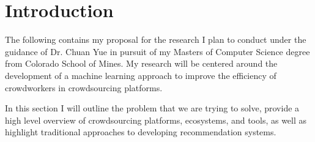 \documentclass[letterpaper,12pt]{article}
\begin{document}





\bodymatter



\chapter{Introduction}

The following contains my proposal for the research I plan to conduct under the guidance of Dr. Chuan Yue in pursuit of my Masters of Computer Science degree from Colorado School of Mines. My research will be centered around the development of a machine learning approach to improve the efficiency of crowdworkers in crowdsourcing platforms.

In this section I will outline the problem that we are trying to solve, provide a high level overview of crowdsourcing platforms, ecosystems, and tools, as well as highlight traditional approaches to developing recommendation systems.
\end{document}
